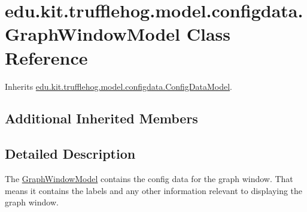 \hypertarget{classedu_1_1kit_1_1trufflehog_1_1model_1_1configdata_1_1_graph_window_model}{}\section{edu.\+kit.\+trufflehog.\+model.\+configdata.\+Graph\+Window\+Model Class Reference}
\label{classedu_1_1kit_1_1trufflehog_1_1model_1_1configdata_1_1_graph_window_model}


Inherits \hyperlink{classedu_1_1kit_1_1trufflehog_1_1model_1_1configdata_1_1_config_data_model}{edu.\+kit.\+trufflehog.\+model.\+configdata.\+Config\+Data\+Model}.

\subsection*{Additional Inherited Members}


\subsection{Detailed Description}
The \hyperlink{classedu_1_1kit_1_1trufflehog_1_1model_1_1configdata_1_1_graph_window_model}{Graph\+Window\+Model} contains the config data for the graph window. That means it contains the labels and any other information relevant to displaying the graph window. 
